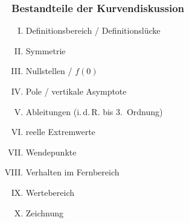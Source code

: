\subsubsection{Bestandteile der Kurvendiskussion}

\begin{enumerate}[I.]
    \item Definitionsbereich / Definitionslücke
    \item Symmetrie
    \item Nullstellen / \( f(0) \)
    \item Pole / vertikale Asymptote
    \item Ableitungen (i.\,d.\,R. bis 3.~Ordnung)
    \item reelle Extremwerte
    \item Wendepunkte
    \item Verhalten im Fernbereich
    \item Wertebereich
    \item Zeichnung
\end{enumerate}
